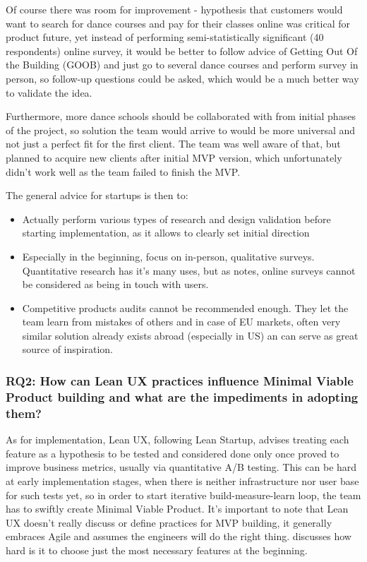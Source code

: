 \documentclass{article}
\begin{document}
Of course there was room for improvement - hypothesis that customers would want to search for dance courses and pay for their classes online was critical for product future, yet instead of performing semi-statistically significant (40 respondents) online survey, it would be better to follow \cite{blank2013four} advice of Getting Out Of the Building (GOOB) and just go to several dance courses and perform survey in person, so follow-up questions could be asked, which would be a much better way to validate the idea.

Furthermore, more dance schools should be collaborated with from initial phases of the project, so solution the team would arrive to would be more universal and not just a perfect fit for the first client. The team was well aware of that, but planned to acquire new clients after initial MVP version, which unfortunately didn't work well as the team failed to finish the MVP.

The general advice for startups is then to:
\begin{itemize}
\item Actually perform various types of research and design validation before starting implementation, as it allows to clearly set initial direction
\item Especially in the beginning, focus on in-person, qualitative surveys. Quantitative research has it's many uses, but as \cite{klein2013ux} notes, online surveys cannot be considered as being in touch with users.
\item Competitive products audits cannot be recommended enough. They let the team learn from mistakes of others and in case of EU markets, often very similar solution already exists abroad (especially in US) an can serve as great source of inspiration.
\end{itemize}

\subsubsection{RQ2: How can Lean UX practices influence Minimal Viable Product building and what are the impediments in adopting them?}
As for implementation, Lean UX, following Lean Startup, advises treating each feature as a hypothesis to be tested and considered done only once proved to improve business metrics, usually via quantitative A/B testing. This can be hard at early implementation stages, when there is neither infrastructure nor user base for such tests yet, so in order to start iterative build-measure-learn loop, the team has to swiftly create Minimal Viable Product. It's important to note that Lean UX doesn't really discuss or define practices for MVP building, it generally embraces Agile and assumes the engineers will do the right thing. \cite{klein2013ux} discusses how hard is it to choose just the most necessary features at the beginning.
\end{document}
